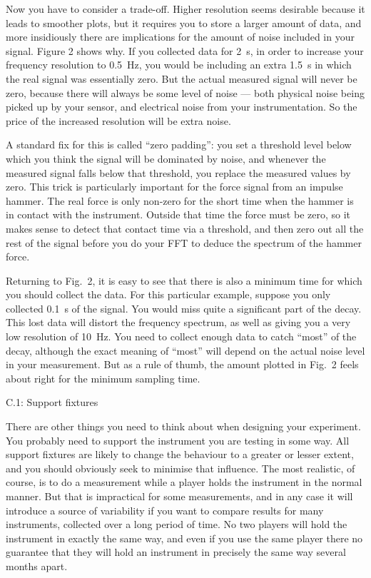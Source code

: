
  Now you have to consider a trade-off. Higher resolution seems desirable 
  because it leads to smoother plots, but it requires you to store a larger 
  amount of data, and more insidiously there are implications for the amount of 
  noise included in your signal. Figure 2 shows why. If you collected data for 
  2~s, in order to increase your frequency resolution to 0.5~Hz, you would be 
  including an extra 1.5~s in which the real signal was essentially zero. But 
  the actual measured signal will never be zero, because there will always be 
  some level of noise — both physical noise being picked up by your sensor, and 
  electrical noise from your instrumentation. So the price of the increased 
  resolution will be extra noise. 

  A standard fix for this is called “zero padding”: you set a threshold level 
  below which you think the signal will be dominated by noise, and whenever the 
  measured signal falls below that threshold, you replace the measured values 
  by zero. This trick is particularly important for the force signal from an 
  impulse hammer. The real force is only non-zero for the short time when the 
  hammer is in contact with the instrument. Outside that time the force must be 
  zero, so it makes sense to detect that contact time via a threshold, and then 
  zero out all the rest of the signal before you do your FFT to deduce the 
  spectrum of the hammer force. 

  Returning to Fig.\ 2, it is easy to see that there is also a minimum time for 
  which you should collect the data. For this particular example, suppose you 
  only collected 0.1~s of the signal. You would miss quite a significant part 
  of the decay. This lost data will distort the frequency spectrum, as well as 
  giving you a very low resolution of 10~Hz. You need to collect enough data to 
  catch “most” of the decay, although the exact meaning of “most” will depend 
  on the actual noise level in your measurement. But as a rule of thumb, the 
  amount plotted in Fig.\ 2 feels about right for the minimum sampling time. 


  C.1: Support fixtures 

  There are other things you need to think about when designing your 
  experiment. You probably need to support the instrument you are testing in 
  some way. All support fixtures are likely to change the behaviour to a 
  greater or lesser extent, and you should obviously seek to minimise that 
  influence. The most realistic, of course, is to do a measurement while a 
  player holds the instrument in the normal manner. But that is impractical for 
  some measurements, and in any case it will introduce a source of variability 
  if you want to compare results for many instruments, collected over a long 
  period of time. No two players will hold the instrument in exactly the same 
  way, and even if you use the same player there no guarantee that they will 
  hold an instrument in precisely the same way several months apart. 

